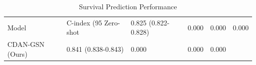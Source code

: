\begin{table}
\caption{Survival Prediction Performance}
\label{tab:performance}
\begin{tabular}{lllll}
\toprule
Model & C-index (95%
\midrule
Zero-shot & 0.825 (0.822-0.828) & 0.000 & 0.000 & 0.000 \\
CDAN-GSN (Ours) & 0.841 (0.838-0.843) & 0.000 & 0.000 & 0.000 \\
\bottomrule
\end{tabular}
\end{table}
